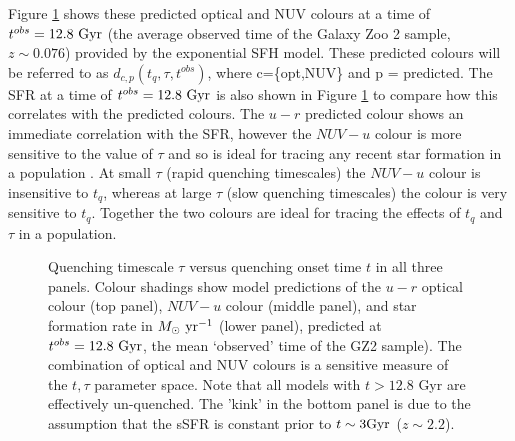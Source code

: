 \documentclass[useAMS,usenatbib]{mn2e}
\begin{document}
Figure \ref{pred} shows these predicted optical and NUV colours at a time of $t^{obs} = 12.8 ~\rm{Gyr}$ (the average observed time of the Galaxy Zoo 2 sample, $z \sim 0.076$) provided by the exponential SFH model. These predicted colours will be referred to as $d_{c,p}(t_{q}, \tau, t^{obs})$, where c=\{opt,NUV\} and p = predicted. The SFR at a time of $t^{obs}=12.8~\rm{Gyr}$ is also shown in Figure \ref{pred} to compare how this correlates with the predicted colours. The $u-r$ predicted colour shows an immediate correlation with the SFR, however the $NUV-u$ colour is more sensitive to the value of $\tau$ and so is ideal for tracing any recent star formation in a population . At small $\tau$ (rapid quenching timescales) the $NUV-u$ colour is insensitive to $t_{q}$, whereas at large $\tau$ (slow quenching timescales) the colour is very sensitive to $t_{q}$. Together the two colours are ideal for tracing the effects of $t_{q}$ and $\tau$ in a population. 


\begin{figure}
\caption{Quenching timescale $\tau$ versus quenching onset time $t$ in all three panels. Colour shadings show model predictions of the $u-r$ optical colour (top panel), $NUV-u$ colour (middle panel), and star formation rate in $M_\odot \rm{~yr}^{-1}$ (lower panel), predicted at $t^{obs} = 12.8~\rm{Gyr}$, the mean `observed' time of the GZ2 sample). The combination of optical and NUV colours is a sensitive measure of the $t, \tau$ parameter space. Note that all models with $t > 12.8$ \rm{Gyr} are effectively un-quenched. The 'kink' in the bottom panel is due to the assumption that the sSFR is constant prior to $t\sim3\rm{Gyr}$ ($z\sim 2.2$).}
\label{pred}
\end{figure}
\end{document}
